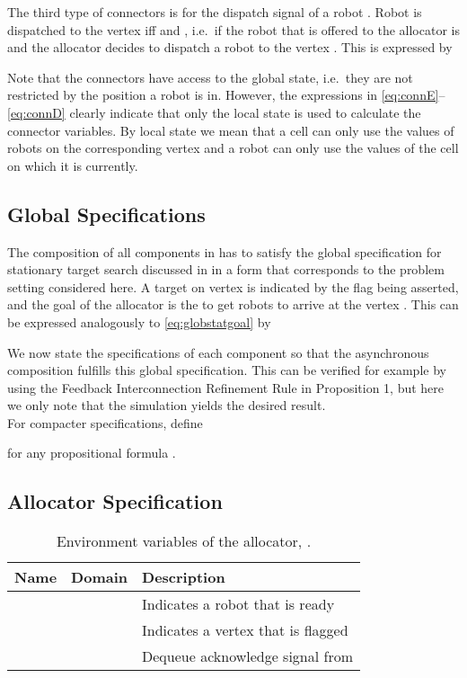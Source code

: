 The third type of connectors is for the dispatch signal  of a robot . Robot  is dispatched to the vertex  iff  and , i.e.\ if the robot that is offered to the allocator is  and the allocator decides to dispatch a robot to the vertex . This is expressed by

Note that the connectors have access to the global state, i.e.\ they are not restricted by the position a robot is in. However, the expressions in \eqref{eq:connE}--\eqref{eq:connD} clearly indicate that only the local state is used to calculate the connector variables. By local state we mean that a cell can only use the values of robots on the corresponding vertex and a robot can only use the values of the cell on which it is currently.\\



\subsection{Global Specifications} 

The composition of all components in  has to satisfy the global specification for stationary target search discussed in  in a form that corresponds to the problem setting considered here. A target on vertex  is indicated by the flag  being asserted, and the goal of the allocator is the to get  robots to arrive at the vertex . This can be expressed analogously to \eqref{eq:globstatgoal} by


We now state the specifications of each component so that the asynchronous composition fulfills this global specification. This can be verified for example by using the Feedback Interconnection Refinement Rule in Proposition 1, but here we only note that the simulation yields the desired result.\\

For compacter specifications, define

for any propositional formula .\\

\subsection{Allocator Specification}

\begin{table}
\centering
\begin{tabular}{c|c|l}
\hline
Name & Domain & Description \\
\hline
 &  & Indicates a robot that is ready \\
 &  & Indicates a vertex that is flagged \\
 &  & Dequeue acknowledge signal from  \\
\hline
\end{tabular}
\caption{Environment variables of the allocator, .}
\label{tab:env:alloc}
\end{table}

